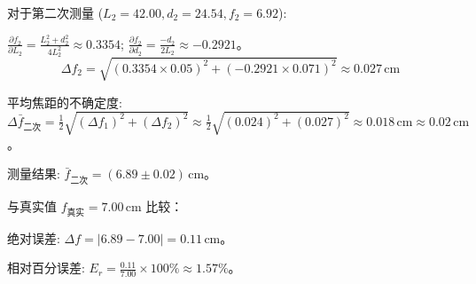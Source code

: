 ﻿\documentclass[12pt,a4paper]{article}
\newcommand{\rmcm}{\mathrm{\,cm}}
\begin{document}
\par 对于第二次测量 ($L_2=42.00, d_2=24.54, f_2=6.92$):
\par $\frac{\partial f_2}{\partial L_2} = \frac{L_2^2+d_2^2}{4L_2^2} \approx 0.3354$; $\frac{\partial f_2}{\partial d_2} = \frac{-d_2}{2L_2} \approx -0.2921$。
\begin{equation*}
\Delta f_2 = \sqrt{\left(0.3354 \times 0.05\right)^2 + \left(-0.2921 \times 0.071\right)^2} \approx 0.027 \rmcm
\end{equation*}
\par 平均焦距的不确定度: $\Delta \bar{f}_{\text{二次}} = \frac{1}{2}\sqrt{(\Delta f_1)^2 + (\Delta f_2)^2} \approx \frac{1}{2}\sqrt{(0.024)^2 + (0.027)^2} \approx 0.018 \rmcm \approx 0.02 \rmcm$。
\par 测量结果: $\bar{f}_{\text{二次}} = (6.89 \pm 0.02) \rmcm$。
\par 与真实值 $f_{\text{真实}} = 7.00 \rmcm$ 比较：
\par 绝对误差: $\Delta f = |6.89 - 7.00| = 0.11 \rmcm$。
\par 相对百分误差: $E_r = \frac{0.11}{7.00} \times 100\% \approx 1.57\%$。
\end{document}
